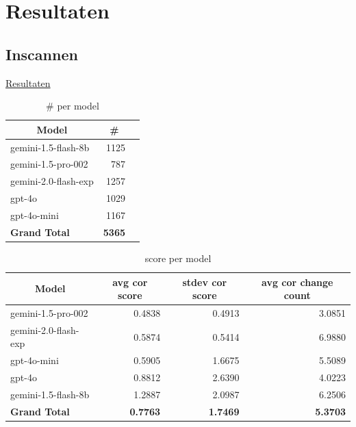\documentclass[12pt]{article}
\begin{document}
\section{Resultaten}
\subsection{Inscannen}


\href{https://docs.google.com/spreadsheets/d/1wbHiG81i-UJ18s6gP3i_WtsPD-FBQTqg7AwNjN8Rm2g}{Resultaten}

\noindent\begin{table}[H]
\caption{\# per model}
\label{fig:count-model}
\begin{tabularx}{\textwidth}{X *2{r}}
    \toprule
    \multicolumn{1}{c}{\textbf{Model}} & \multicolumn{1}{c}{\textbf{\#}} \\  %
    \midrule
    gemini-1.5-flash-8b & 1125 \\
    gemini-1.5-pro-002 & 787 \\
    gemini-2.0-flash-exp & 1257 \\
    gpt-4o & 1029 \\
    gpt-4o-mini & 1167 \\
    \midrule
    \textbf{Grand Total} & \textbf{5365} \\
    \bottomrule
    
\end{tabularx}%
\end{table}



\noindent\begin{table}[H]
\caption{score per model}
\label{fig:score-model}
\begin{tabularx}{\textwidth}{X *3{r}}
    \toprule
    \multicolumn{1}{c}{\textbf{Model}} & \multicolumn{1}{c}{\textbf{avg cor score}} & \multicolumn{1}{c}{\textbf{stdev cor score}} & \multicolumn{1}{c}{\textbf{avg cor change count}} \\
    \midrule
    gemini-1.5-pro-002 & 0.4838 & 0.4913 & 3.0851 \\
    gemini-2.0-flash-exp & 0.5874 & 0.5414 & 6.9880 \\
    gpt-4o-mini & 0.5905 & 1.6675 & 5.5089 \\
    gpt-4o & 0.8812 & 2.6390 & 4.0223 \\
    gemini-1.5-flash-8b & 1.2887 & 2.0987 & 6.2506 \\
    \midrule
    \textbf{Grand Total} & \textbf{0.7763} & \textbf{1.7469} & \textbf{5.3703} \\
    \bottomrule
\end{tabularx}%
\end{table}
\end{document}
